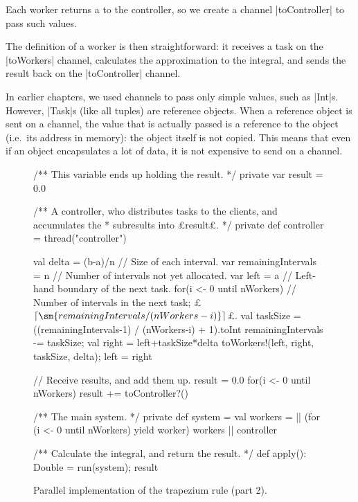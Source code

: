 Each worker returns a  to the controller, so we create a channel
|toController| to pass such values.

The definition of a worker is then straightforward: it receives a task on the
|toWorkers| channel, calculates the approximation to the integral, and sends
the result back on the |toController| channel.

In earlier chapters, we used channels to pass only simple values, such as
|Int|s.  However, |Task|s (like all tuples) are reference objects.  When a
reference object is sent on a channel, the value that is actually passed is a
reference to the object (i.e.~its address in memory): the object itself is not
copied.  This means that even if an object encapsulates a lot of data, it is
not expensive to send on a channel.


\begin{figure}
\begin{scala}
  /** This variable ends up holding the result. */
  private var result = 0.0

  /** A controller, who distributes tasks to the clients, and accumulates the
    * subresults into £result£. */
  private def controller = thread("controller"){
    val delta = (b-a)/n    // Size of each interval.
    var remainingIntervals = n    // Number of intervals not yet allocated.
    var left = a // Left-hand boundary of the next task.
    for(i <- 0 until nWorkers){
      // Number of intervals in the next task; £$\lceil \sm{remainingIntervals/(nWorkers-i)} \rceil$£.
      val taskSize = ((remainingIntervals-1) / (nWorkers-i) + 1).toInt
      remainingIntervals -= taskSize; val right = left+taskSize*delta
      toWorkers!(left, right, taskSize, delta); left = right
    }

    // Receive results, and add them up.
    result = 0.0
    for(i <- 0 until nWorkers) result += toController?()
  }    
    
  /** The main system. */
  private def system = {
    val workers = || (for (i <- 0 until nWorkers) yield worker)
    workers || controller
  }

  /** Calculate the integral, and return the result. */
  def apply(): Double = { run(system); result } 
\end{scala}
\caption{Parallel implementation of the trapezium rule (part 2).}
\label{fig:trapezium-2}
\end{figure}


